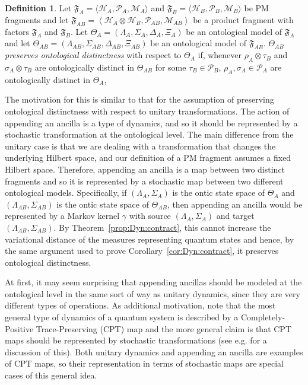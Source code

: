 \documentclass[DIV=calc,paper=a4,fontsize=11pt,twocolumn]{scrartcl} %
\theoremstyle{definition}
\newtheorem{definition}{Definition}[section]
\theoremstyle{plain}
\newcommand{\Hilb}[1][]{\ensuremath{\mathcal{H}_{#1}}}
\begin{document}
\begin{definition}
\label{def:Dyn:aind}
Let $\mathfrak{F}_A = \langle \Hilb[A], \mathcal{P}_A, \mathcal{M}_A
\rangle$ and $\mathfrak{F}_B = \langle \Hilb[B], \mathcal{P}_B,
\mathcal{M}_B \rangle$ be PM fragments and let $\mathfrak{F}_{AB} =
\left \langle \Hilb[A] \otimes \Hilb[B], \mathcal{P}_{AB} ,
\mathcal{M}_{AB} \right \rangle$ be a product fragment with
factors $\mathfrak{F}_A$ and $\mathfrak{F}_B$.  Let $\Theta_A =
(\Lambda_A, \Sigma_A, \Delta_A,\Xi_A)$ be an ontological model of
$\mathfrak{F}_A$ and let $\Theta_{AB} = (\Lambda_{AB}, \Sigma_{AB},
\Delta_{AB}, \Xi_{AB})$ be an ontological model of
$\mathfrak{F}_{AB}$.  $\Theta_{AB}$ \emph{preserves ontological
distinctness} with respect to $\Theta_A$ if, whenever $\rho_A
\otimes \tau_B$ and $\sigma_A \otimes \tau_B$ are ontologically
distinct in $\Theta_{AB}$ for some $\tau_B \in \mathcal{P}_B$,
$\rho_A, \sigma_A \in \mathcal{P}_A$ are ontologically distinct in
$\Theta_A$,
\end{definition}

The motivation for this is similar to that for the assumption of
preserving ontological distinctness with respect to unitary
transformations.  The action of appending an ancilla is a type of
dynamics, and so it should be represented by a stochastic
transformation at the ontological level.  The main difference from the
unitary case is that we are dealing with a transformation that changes
the underlying Hilbert space, and our definition of a PM fragment
assumes a fixed Hilbert space.  Therefore, appending an ancilla is a
map between two distinct fragments and so it is represented by a
stochastic map between two different ontological models.
Specifically, if $(\Lambda_A, \Sigma_A)$ is the ontic state space of
$\Theta_A$ and $(\Lambda_{AB},\Sigma_{AB})$ is the ontic state space
of $\Theta_{AB}$, then appending an ancilla would be represented by a
Markov kernel $\gamma$ with source $(\Lambda_A, \Sigma_A)$ and target
$(\Lambda_{AB},\Sigma_{AB})$.  By Theorem~\ref{prop:Dyn:contract},
this cannot increase the variational distance of the measures
representing quantum states and hence, by the same argument used to
prove Corollary~\ref{cor:Dyn:contract}, it preserves ontological
distinctness.

At first, it may seem surprising that appending ancillas should be
modeled at the ontological level in the same sort of way as unitary
dynamics, since they are very different types of operations.  As
additional motivation, note that the most general type of dynamics of
a quantum system is described by a Completely-Positive
Trace-Preserving (CPT) map and the more general claim is that CPT maps
should be represented by stochastic transformations (see
e.g. \cite{Spekkens2005} for a discussion of this).  Both unitary
dynamics and appending an ancilla are examples of CPT maps, so their
representation in terms of stochastic maps are special cases of this
general idea.
\end{document}
